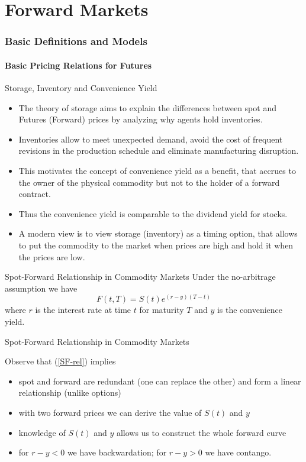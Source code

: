\part{Forward Markets}
\section{Basic Definitions and Models}
\subsection{Basic Pricing Relations for Futures}

{Storage, Inventory and Convenience Yield}
\begin{itemize}
\item<1-> The theory of storage aims to explain the differences between spot
and Futures (Forward) prices by analyzing why agents hold inventories.
\item<2-> Inventories
allow to meet unexpected demand, avoid the cost of frequent revisions in
the production schedule and eliminate manufacturing disruption.
\item<3-> This
motivates the concept of convenience yield as a benefit, that accrues to the
owner of the physical commodity but not to the holder of a forward contract.
\item<4-> Thus the convenience yield is comparable to the dividend yield for stocks.
\item<5-> A modern view is to view storage (inventory) as a timing option, that
allows to put the commodity to the market when prices are high
and hold it when the prices are low.
\end{itemize}

{Spot-Forward Relationship in Commodity Markets }
Under the no-arbitrage assumption we have
\begin{equation}\label{SF-rel}
F(t,T)=S(t)e^{(r-y)(T-t)}
\end{equation}
where $r$ is the interest rate at time $t$ for maturity $T$ and $y$ is the convenience yield.

{Spot-Forward Relationship in Commodity Markets }

Observe that (\ref{SF-rel}) implies
\begin{itemize}
\item<1-> spot and forward are redundant (one can replace the other) and form a
linear relationship (unlike options)
\item<2-> with two forward prices we can derive the value of $S(t)$ and $y$
\item<3-> knowledge of $S(t)$ and $y$ allows us to construct the whole forward curve
\item<4-> for $r-y <0$ we have backwardation; for $r-y>0$ we have contango.
\end{itemize}

